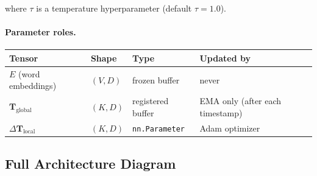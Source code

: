 \documentclass[11pt,a4paper]{article}
\begin{document}
where $\tau$ is a temperature hyperparameter (default $\tau = 1.0$).

\paragraph{Parameter roles.}
\begin{center}
\begin{tabular}{llll}
\toprule
Tensor & Shape & Type & Updated by \\
\midrule
$E$ (word embeddings) & $(V, D)$ & frozen buffer & never \\
$\mathbf{T}_\text{global}$ & $(K, D)$ & registered buffer & EMA only (after each timestamp) \\
$\Delta\mathbf{T}_\text{local}$ & $(K, D)$ & \texttt{nn.Parameter} & Adam optimizer \\
\bottomrule
\end{tabular}
\end{center}

\subsection{Full Architecture Diagram}
\end{document}
